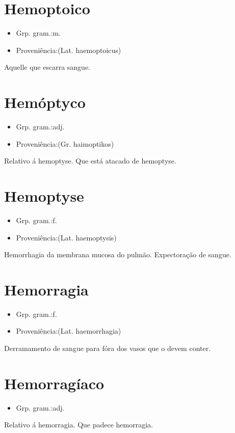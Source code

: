 \documentclass{article}
\begin{document}
\section{Hemoptoico}
\begin{itemize}
\item {Grp. gram.:m.}
\end{itemize}
\begin{itemize}
\item {Proveniência:(Lat. \textunderscore haemoptoicus\textunderscore )}
\end{itemize}
Aquelle que escarra sangue.
\section{Hemóptyco}
\begin{itemize}
\item {Grp. gram.:adj.}
\end{itemize}
\begin{itemize}
\item {Proveniência:(Gr. \textunderscore haimoptikos\textunderscore )}
\end{itemize}
Relativo á hemoptyse.
Que está atacado de hemoptyse.
\section{Hemoptyse}
\begin{itemize}
\item {Grp. gram.:f.}
\end{itemize}
\begin{itemize}
\item {Proveniência:(Lat. \textunderscore haemoptysis\textunderscore )}
\end{itemize}
Hemorrhagia da membrana mucosa do pulmão.
Expectoração de sangue.
\section{Hemorragia}
\begin{itemize}
\item {Grp. gram.:f.}
\end{itemize}
\begin{itemize}
\item {Proveniência:(Lat. \textunderscore haemorrhagia\textunderscore )}
\end{itemize}
Derramamento de sangue para fóra dos vasos que o devem conter.
\section{Hemorragíaco}
\begin{itemize}
\item {Grp. gram.:adj.}
\end{itemize}
Relativo á hemorragia.
Que padece hemorragia.
\end{document}
